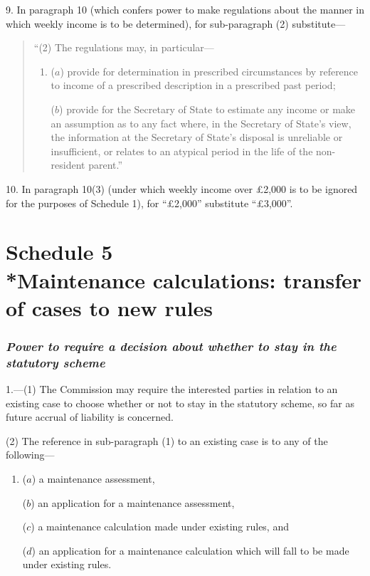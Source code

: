 \documentclass[12pt,a4paper]{article}
\begin{document}
9. In paragraph 10 (which confers power to make regulations about the manner in which weekly income is to be determined), for sub-paragraph (2) substitute—
\begin{quotation}
“(2) The regulations may, in particular—
\begin{enumerate}\item[]
($a$) provide for determination in prescribed circumstances by reference to income of a prescribed description in a prescribed past period;

($b$) provide for the Secretary of State to estimate any income or make an assumption as to any fact where, in the Secretary of State's view, the information at the Secretary of State's disposal is unreliable or insufficient, or relates to an atypical period in the life of the non-resident parent.”
\end{enumerate}
\end{quotation}


\medskip

10. In paragraph 10(3) (under which weekly income over £2,000 is to be ignored for the purposes of Schedule 1), for “£2,000” substitute “£3,000”.

\part[Schedule 5 --- Maintenance calculations: transfer of cases to new rules]{Schedule 5\\*Maintenance calculations: transfer of cases to new rules}

\renewcommand\parthead{--- Schedule 5}

\section*{\itshape Power to require a decision about whether to stay in the statutory scheme}

1.---(1) The Commission may require the interested parties in relation to an existing case to choose whether or not to stay in the statutory scheme, so far as future accrual of liability is concerned.

(2) The reference in sub-paragraph (1) to an existing case is to any of the following—
\begin{enumerate}\item[]
($a$) a maintenance assessment,

($b$) an application for a maintenance assessment,

($c$) a maintenance calculation made under existing rules, and

($d$) an application for a maintenance calculation which will fall to be made under existing rules.
\end{enumerate}
\end{document}
